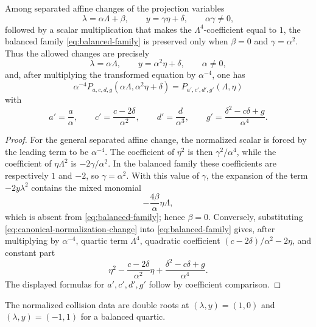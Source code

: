 \begin{lemma}\label{lem:balanced-affine}
Among separated affine changes of the projection variables
\[
\lambda=\alpha\Lambda+\beta,
\qquad
y=\gamma\eta+\delta,
\qquad \alpha\gamma\ne0,
\]
followed by a scalar multiplication that makes the \(\Lambda^4\)-coefficient equal to \(1\), the balanced family \eqref{eq:balanced-family} is preserved only when
\(\beta=0\) and \(\gamma=\alpha^2\).  Thus the allowed changes are precisely
\begin{equation}\label{eq:canonical-normalization-change}
\lambda=\alpha\Lambda,
\qquad
 y=\alpha^2 \eta+\delta,
\qquad \alpha\ne0,
\end{equation}
and, after multiplying the transformed equation by \(\alpha^{-4}\), one has
\[
\alpha^{-4}P_{a,c,d,g}(\alpha\Lambda,\alpha^2\eta+\delta)
=P_{a',c',d',g'}(\Lambda,\eta)
\]
with
\begin{equation}\label{eq:canonical-transformed-parameters}
a'=\frac a\alpha,
\qquad
c'=\frac{c-2\delta}{\alpha^2},
\qquad
d'=\frac d{\alpha^3},
\qquad
g'=\frac{\delta^2-c\delta+g}{\alpha^4}.
\end{equation}
\end{lemma}
\begin{proof}
For the general separated affine change, the normalized scalar is forced by the leading term to be \(\alpha^{-4}\).  The coefficient of \(\eta^2\) is then \(\gamma^2/\alpha^4\), while the coefficient of \(\eta\Lambda^2\) is \(-2\gamma/\alpha^2\).  In the balanced family these coefficients are respectively \(1\) and \(-2\), so \(\gamma=\alpha^2\).  With this value of \(\gamma\), the expansion of the term \(-2y\lambda^2\) contains the mixed monomial
\[
-\frac{4\beta}{\alpha}\eta\Lambda,
\]
which is absent from \eqref{eq:balanced-family}; hence \(\beta=0\).  Conversely, substituting \eqref{eq:canonical-normalization-change} into \eqref{eq:balanced-family} gives, after multiplying by \(\alpha^{-4}\), quartic term \(\Lambda^4\), quadratic coefficient \((c-2\delta)/\alpha^2-2\eta\), and constant part
\[
\eta^2-\frac{c-2\delta}{\alpha^2}\eta+\frac{\delta^2-c\delta+g}{\alpha^4}.
\]
The displayed formulas for \(a',c',d',g'\) follow by coefficient comparison.
\end{proof}

\begin{definition}\label{def:normalized-collision-data}
The normalized collision data are double roots at $(\lambda,y)=(1,0)$ and $(\lambda,y)=(-1,1)$ for a balanced quartic.
\end{definition}

